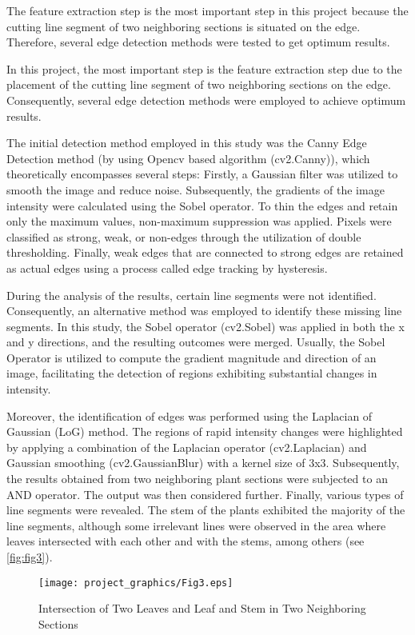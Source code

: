 \documentclass[]{iat}
\begin{document}
The feature extraction step is the most important step in this project because the cutting line segment of two neighboring sections is situated on the edge. Therefore, several edge detection methods were tested to get optimum results.
\par
In this project, the most important step is the feature extraction step due to the placement of the cutting line segment of two neighboring sections on the edge. Consequently, several edge detection methods were employed to achieve optimum results.
\par
The initial detection method employed in this study was the Canny Edge Detection method (by using Opencv based algorithm (cv2.Canny)), which theoretically encompasses several steps: Firstly, a Gaussian filter was utilized to smooth the image and reduce noise. Subsequently, the gradients of the image intensity were calculated using the Sobel operator. To thin the edges and retain only the maximum values, non-maximum suppression was applied. Pixels were classified as strong, weak, or non-edges through the utilization of double thresholding. Finally, weak edges that are connected to strong edges are retained as actual edges using a process called edge tracking by hysteresis. 
\par
During the analysis of the results, certain line segments were not identified. Consequently, an alternative method was employed to identify these missing line segments. In this study, the Sobel operator (cv2.Sobel) was applied in both the x and y directions, and the resulting outcomes were merged. Usually, the Sobel Operator is utilized to compute the gradient magnitude and direction of an image, facilitating the detection of regions exhibiting substantial changes in intensity. 
\par
Moreover, the identification of edges was performed using the Laplacian of Gaussian (LoG) method. The regions of rapid intensity changes were highlighted by applying a combination of the Laplacian operator (cv2.Laplacian) and Gaussian smoothing (cv2.GaussianBlur) with a kernel size of 3x3. Subsequently, the results obtained from two neighboring plant sections were subjected to an AND operator. The output was then considered further. Finally, various types of line segments were revealed. The stem of the plants exhibited the majority of the line segments, although some irrelevant lines were observed in the area where leaves intersected with each other and with the stems, among others (see \autoref{fig:fig3}).
\FloatBarrier
\clearpage
\begin{figure}[h]
    
	\texttt{[image: project\_graphics/Fig3.eps]}
	\caption{Intersection of Two Leaves and Leaf and Stem in Two Neighboring Sections}
	\label{fig:fig3}
\end{figure}
\end{document}
